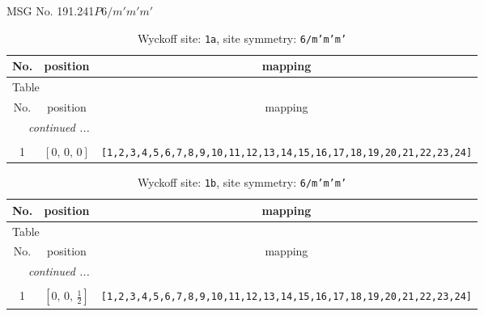 \documentclass[fleqn,8pt]{jsarticle}
\begin{document}
\setcounter{MaxMatrixCols}{32}

\renewcommand{\tablename}{Table~}
\renewcommand{\figurename}{Figure~}
\begin{center}
\LARGE
MSG No. 191.241\quad$P6/m'm'm'$
\end{center}
\renewcommand{\arraystretch}{1.2}
\begin{longtable}{ccc}
\caption{Wyckoff site: {\tt 1a}, site symmetry: {\tt 6/m'm'm'}}
 \\
 \hline \hline
No. & position & mapping \\ \hline \endfirsthead

\multicolumn{2}{l}{\tablename\ \thetable{}} \\
 \hline \hline
No. & position & mapping \\ \hline \endhead

 \hline \hline
\multicolumn{2}{r}{\footnotesize\it continued ...} \\ \endfoot

 \hline \hline
\multicolumn{2}{r}{} \\ \endlastfoot

1 & $\left[ 0,\, 0,\, 0 \right]$ & {\tt [1,2,3,4,5,6,7,8,9,10,11,12,13,14,15,16,17,18,19,20,21,22,23,24]} \\
\end{longtable}
\renewcommand{\arraystretch}{1.2}
\begin{longtable}{ccc}
\caption{Wyckoff site: {\tt 1b}, site symmetry: {\tt 6/m'm'm'}}
 \\
 \hline \hline
No. & position & mapping \\ \hline \endfirsthead

\multicolumn{2}{l}{\tablename\ \thetable{}} \\
 \hline \hline
No. & position & mapping \\ \hline \endhead

 \hline \hline
\multicolumn{2}{r}{\footnotesize\it continued ...} \\ \endfoot

 \hline \hline
\multicolumn{2}{r}{} \\ \endlastfoot

1 & $\left[ 0,\, 0,\, \frac{1}{2} \right]$ & {\tt [1,2,3,4,5,6,7,8,9,10,11,12,13,14,15,16,17,18,19,20,21,22,23,24]} \\
\end{longtable}
\renewcommand{\arraystretch}{1.2}
\end{document}
